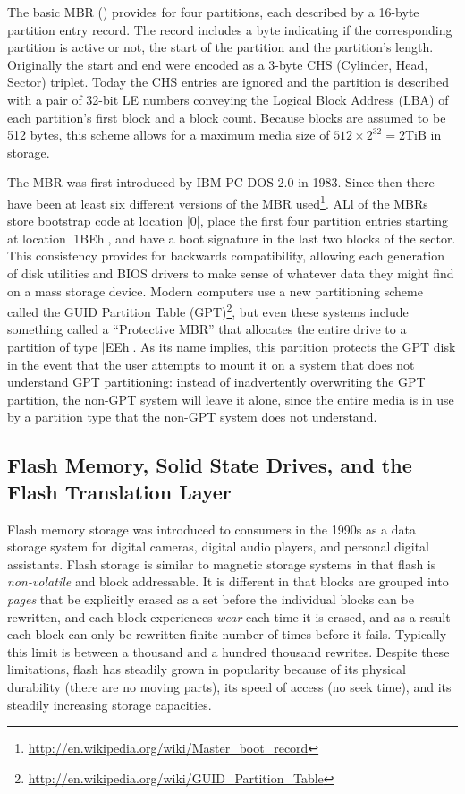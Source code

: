 The basic MBR () provides for four partitions, each
described by a 16-byte partition entry record. The record includes a
byte indicating if the corresponding partition is active or not, the
start of the partition and the partition's length.  Originally the
start and end were encoded as a 3-byte CHS (Cylinder, Head, Sector)
triplet. Today the CHS entries are ignored and the partition is
described with a pair of 32-bit LE numbers conveying the Logical Block
Address (LBA) of each partition's first block and a block
count. Because blocks are assumed to be 512 bytes, this scheme allows
for a maximum media size of $512 \times 2^{32}=2\textrm{TiB}$ in
storage.

The MBR was first introduced by
IBM PC DOS 2.0 in 1983. Since then there have been at least six different
versions of the MBR
used\footnote{\url{http://en.wikipedia.org/wiki/Master_boot_record}}. ALl
of the MBRs store bootstrap code
at location |0|, place the first four partition entries starting at location
|1BEh|, and have a boot signature in the last two blocks of the
sector. This consistency provides for backwards compatibility,
allowing each generation of disk utilities and BIOS drivers to make
sense of whatever data they might find on a mass storage device.
Modern computers use a new partitioning scheme called the GUID
Partition Table
(GPT)\footnote{\url{http://en.wikipedia.org/wiki/GUID_Partition_Table}},
but even these systems include something called a ``Protective MBR''
that allocates the entire drive to a partition of type |EEh|. As its
name implies, this partition protects the GPT disk in the event that
the user attempts to mount it on a system that does not understand GPT
partitioning: instead of inadvertently overwriting the GPT partition,
the non-GPT system will leave it alone, since the entire media is in
use by a partition type that the non-GPT system does not understand.


\subsection{Flash Memory, Solid State Drives, and the Flash Translation Layer}

Flash memory storage was introduced to consumers in the 1990s as a
data storage system for digital cameras, digital audio players, and
personal digital assistants. Flash storage is
similar to magnetic storage systems in that flash is \emph{non-volatile} and block
addressable. It is different in that blocks are grouped into
\emph{pages} that be explicitly erased
as a set before the individual blocks can be rewritten, and each block
experiences \emph{wear} each time it is erased, and as a result each
block can only be rewritten finite number of times before it
fails. Typically this limit is between a thousand and a hundred
thousand rewrites. Despite these limitations, flash has
steadily grown in popularity because of its physical durability (there
are no moving parts), its speed of access (no seek time), and its
steadily increasing storage capacities.

